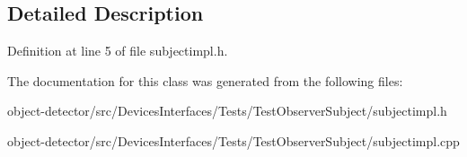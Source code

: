 \subsection{Detailed Description}


Definition at line 5 of file subjectimpl.\+h.



The documentation for this class was generated from the following files\+:\begin{DoxyCompactItemize}
\item 
object-\/detector/src/\+Devices\+Interfaces/\+Tests/\+Test\+Observer\+Subject/subjectimpl.\+h\item 
object-\/detector/src/\+Devices\+Interfaces/\+Tests/\+Test\+Observer\+Subject/subjectimpl.\+cpp\end{DoxyCompactItemize}
